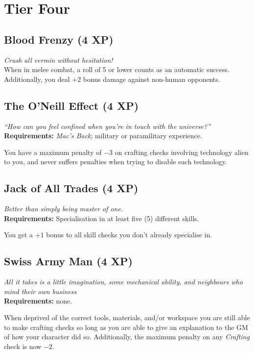 \section{Tier Four}

\subsection*{Blood Frenzy (4 XP)}
\textit{Crush all vermin without hesitation!}\\
When in melee combat, a roll of 5 or lower counts as an automatic success.
Additionally, you deal $+2$ bonus damage against non-human opponents.

\subsection*{The O'Neill Effect (4 XP)}
\textit{``How can you feel confined when you're in touch with the universe?''}\\
\textbf{Requirements:} \textit{Mac's Back}; military or paramilitary experience. 

You have a maximum penalty of $-3$ on crafting checks involving technology alien to you, and never suffers penalties when trying to disable such technology.

\subsection*{Jack of All Trades (4 XP)}
\textit{Better than simply being master of one.}\\
\textbf{Requirements:} Specialisation in at least five (5) different skills.

You get a $+1$ bonus to all skill checks you don't already specialise in.

\subsection*{Swiss Army Man (4 XP)}
\textit{All it takes is a little imagination, some mechanical ability, and neighbours who mind their own business}\\
\textbf{Requirements:} none.

When deprived of the correct tools, materials, and/or workspace you are still able to make crafting checks so long as you are able to give an explanation to the GM of how your character did so.
Additionally, the maximum penalty on any \textit{Crafting} check is now $-2$.